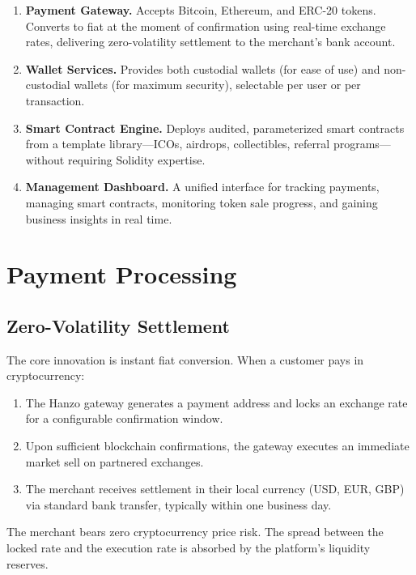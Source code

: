 \documentclass[11pt,twocolumn]{article}
\begin{document}
\begin{enumerate}[leftmargin=1.1em]
    \item \textbf{Payment Gateway.} Accepts Bitcoin, Ethereum, and ERC-20 tokens.
    Converts to fiat at the moment of confirmation using real-time exchange rates,
    delivering zero-volatility settlement to the merchant's bank account.
    \item \textbf{Wallet Services.} Provides both custodial wallets (for ease of
    use) and non-custodial wallets (for maximum security), selectable per user
    or per transaction.
    \item \textbf{Smart Contract Engine.} Deploys audited, parameterized smart
    contracts from a template library---ICOs, airdrops, collectibles, referral
    programs---without requiring Solidity expertise.
    \item \textbf{Management Dashboard.} A unified interface for tracking
    payments, managing smart contracts, monitoring token sale progress, and
    gaining business insights in real time.
\end{enumerate}

\section{Payment Processing}
\label{sec:payments}

\subsection{Zero-Volatility Settlement}

The core innovation is instant fiat conversion. When a customer pays in
cryptocurrency:

\begin{enumerate}[leftmargin=1.1em]
    \item The Hanzo gateway generates a payment address and locks an exchange
    rate for a configurable confirmation window.
    \item Upon sufficient blockchain confirmations, the gateway executes an
    immediate market sell on partnered exchanges.
    \item The merchant receives settlement in their local currency (USD, EUR,
    GBP) via standard bank transfer, typically within one business day.
\end{enumerate}

The merchant bears zero cryptocurrency price risk. The spread between the locked
rate and the execution rate is absorbed by the platform's liquidity reserves.
\end{document}
